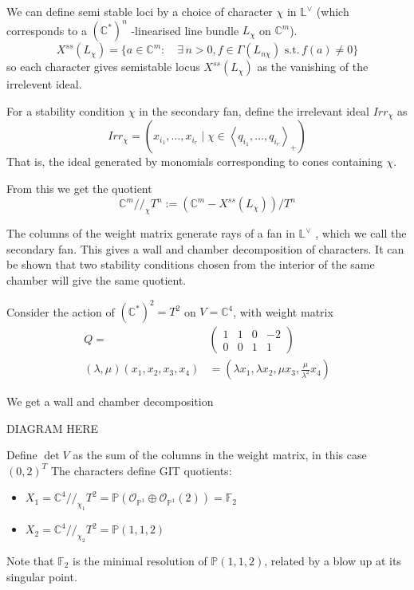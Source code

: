 We can define semi stable loci by a choice of character $\chi$ in $\mathbb{L}^\vee$ (which corresponds to a $(\mathbb{C}^*)^n$ -linearised line bundle $L_\chi$ on $\mathbb{C}^{m}$). $$X^{ss}(L_\chi) = \{ a \in \mathbb{C}^{m}: \quad \exists\, n>0, f\in \Gamma(L_{n\chi})\,\,\text{s.t.} \,f(a)\neq 0 \}$$ so each character gives semistable locus $X^{ss}(L_\chi)$ as the vanishing of the irrelevent ideal.

\begin{definition}
	For a stability condition $\chi$ in the secondary fan, define the irrelevant ideal $Irr_\chi$ as $$
Irr_{\chi}= (x_{i_{1}},\dots,x_{i_{r}} \mid \chi \in \left< q_{i_{1}},\dots,q_{i_{r}}\right>_{+} )
$$ That is, the ideal generated by monomials corresponding to cones containing $\chi$. 
\end{definition}

From this we get the quotient $$
\mathbb{C}^{m}//_{\chi}T^{n}:= \left(\mathbb{C}^{m}-X^{ss}(L_{\chi})\right)  /T^n
$$

The columns of the weight matrix generate rays of a fan in $\mathbb{L}^\vee$ , which we call the secondary fan. This gives a wall and chamber decomposition of characters. It can be shown that two stability conditions chosen from the interior of the same chamber will give the same quotient. 

\begin{example}{}{}
	Consider the action of $(\mathbb{C}^{*})^{2}= T^2$ on $V = \mathbb{C}^4$, with weight matrix
\begin{align*}
Q = &\begin{pmatrix}1&1&0&-2 \\ 0&0&1&1\end{pmatrix} \\
(\lambda,\mu)(x_1,x_2,x_3,x_{4})&= \left( \lambda x_{1}, \lambda x_{2},\mu x_{3}, \frac{\mu}{\lambda^{2}}x_4 \right)
\end{align*}

We get a wall and chamber decomposition 

DIAGRAM HERE

Define $\det V$ as the sum of the columns in the weight matrix, in this case $(0,2)^T$
The characters define GIT quotients: 
\begin{itemize}
	\item  $X_{1}= \mathbb{C}^{4}//_{\chi_{1}}T^{2}= \mathbb{P}(\mathcal{O}_{\mathbb{P}^{1}}\oplus \mathcal{O}_{\mathbb{P}^{1}}(2)) = \mathbb{F}_2$
	\item  $X_{2}= \mathbb{C}^{4}//_{\chi_{2}}T^{2}= \mathbb{P}(1,1,2)$
\end{itemize}

Note that $\mathbb{F}_2$ is the minimal resolution of $\mathbb{P}(1,1,2)$, related by a blow up at its singular point.
\end{example}

